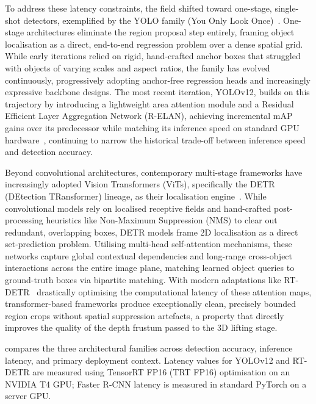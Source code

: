 To address these latency constraints, the field shifted toward one-stage,
single-shot detectors, exemplified by the YOLO family (You Only Look
Once)~\cite{redmon2016}. One-stage architectures eliminate the region proposal
step entirely, framing object localisation as a direct, end-to-end regression
problem over a dense spatial grid. While early iterations relied on rigid,
hand-crafted anchor boxes that struggled with objects of varying scales and
aspect ratios, the family has evolved continuously, progressively adopting
anchor-free regression heads and increasingly expressive backbone designs. The
most recent iteration, YOLOv12, builds on this trajectory by introducing a
lightweight area attention module and a Residual Efficient Layer Aggregation
Network (R-ELAN), achieving incremental mAP gains over its predecessor while
matching its inference speed on standard GPU hardware~\cite{tian2025}, continuing
to narrow the historical trade-off between inference speed and detection accuracy.

Beyond convolutional architectures, contemporary multi-stage frameworks have
increasingly adopted Vision Transformers (ViTs), specifically the DETR (DEtection
TRansformer) lineage, as their localisation engine~\cite{carion2020}. While
convolutional models rely on localised receptive fields and hand-crafted
post-processing heuristics like Non-Maximum Suppression (NMS) to clear out
redundant, overlapping boxes, DETR models frame 2D localisation as a direct
set-prediction problem. Utilising multi-head self-attention mechanisms, these
networks capture global contextual dependencies and long-range cross-object
interactions across the entire image plane, matching learned object queries to
ground-truth boxes via bipartite matching. With modern adaptations like
RT-DETR~\cite{lv2024} drastically optimising the computational latency of these
attention maps, transformer-based frameworks produce exceptionally clean,
precisely bounded region crops without spatial suppression artefacts, a property
that directly improves the quality of the depth frustum passed to the 3D lifting
stage.

 compares the three architectural families across detection
accuracy, inference latency, and primary deployment context. Latency values for
YOLOv12 and RT-DETR are measured using TensorRT FP16 (TRT FP16) optimisation on
an NVIDIA T4 GPU; Faster R-CNN latency is measured in standard PyTorch on a server
GPU.

